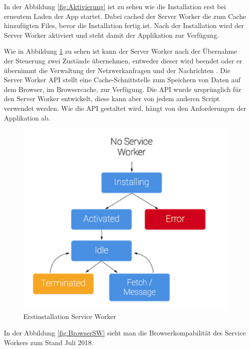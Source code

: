 In der Abbildung \ref{fig:Aktivierung} ist zu sehen wie die Installation erst bei erneutem Laden der App startet. Dabei cached der Server Worker die zum Cache hinzufügten Files, bevor die Installation fertig ist.
Nach der Installation wird der Server Worker aktiviert und steht damit der Applikation zur Verfügung.


Wie in Abbildung \ref{fig:Erstinstallation} zu sehen ist kann der Server Worker nach der Übernahme der Steuerung zwei Zustände übernehmen, entweder dieser wird beendet oder er übernimmt die Verwaltung der Netzwerkanfragen und der Nachrichten \cite{ServiceWorkerRegistration}.
Die Server Worker API stellt eine Cache-Schnittstelle zum Speichern von Daten auf dem Browser, im Browsercache, zur Verfügung. Die API wurde ursprünglich für den Server Worker entwickelt, diese kann aber von jedem anderen Script verwendet werden. 
Wie die API gestaltet wird, hängt von den Anforderungen der Applikation ab.


\begin{figure}[H]
	\centering
	\includegraphics[width=12cm]{BilderAllgemein/InstallSW}\medskip
	\caption{Erstinstallation Service Worker \cite{ServiceWorkerRegistration}}
	\label{fig:Erstinstallation}
\end{figure}


In der Abbildung \ref{fig:BrowserSW} sieht man die Browserkompabilität des Service Workers zum Stand Juli 2018.




